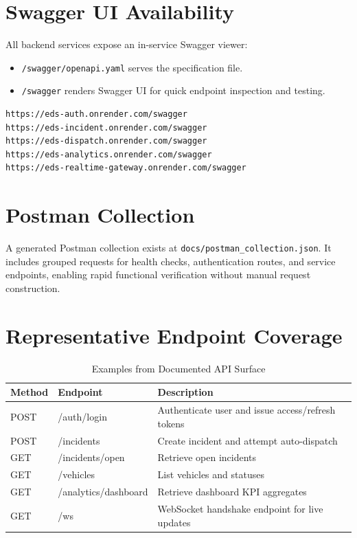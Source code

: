 \documentclass[12pt,a4paper]{report}
\begin{document}
\section{Swagger UI Availability}

All backend services expose an in-service Swagger viewer:

\begin{itemize}
	\item \texttt{/swagger/openapi.yaml} serves the specification file.
	\item \texttt{/swagger} renders Swagger UI for quick endpoint inspection and testing.
\end{itemize}

\begin{lstlisting}[language=bash, caption=Swagger Access Examples, numbers=none]
https://eds-auth.onrender.com/swagger
https://eds-incident.onrender.com/swagger
https://eds-dispatch.onrender.com/swagger
https://eds-analytics.onrender.com/swagger
https://eds-realtime-gateway.onrender.com/swagger
\end{lstlisting}

\section{Postman Collection}

A generated Postman collection exists at \texttt{docs/postman\_collection.json}. It includes grouped requests for health checks, authentication routes, and service endpoints, enabling rapid functional verification without manual request construction.

\section{Representative Endpoint Coverage}

\begin{table}[H]
\centering\small
\caption{Examples from Documented API Surface}
\begin{tabular}{|l|l|l|}
\hline
\textbf{Method} & \textbf{Endpoint} & \textbf{Description} \\
\hline
POST & /auth/login & Authenticate user and issue access/refresh tokens \\
\hline
POST & /incidents & Create incident and attempt auto-dispatch \\
\hline
GET & /incidents/open & Retrieve open incidents \\
\hline
GET & /vehicles & List vehicles and statuses \\
\hline
GET & /analytics/dashboard & Retrieve dashboard KPI aggregates \\
\hline
GET & /ws & WebSocket handshake endpoint for live updates \\
\hline
\end{tabular}
\end{table}
\end{document}
